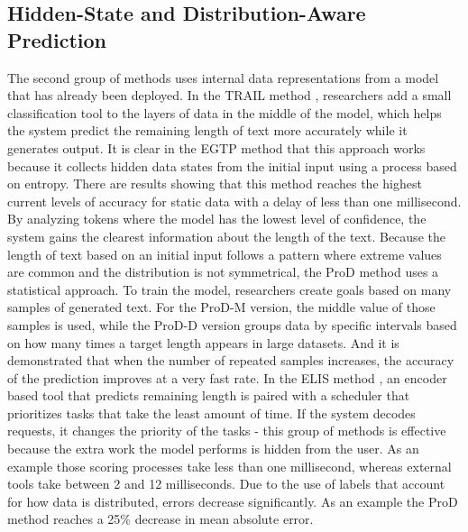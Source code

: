 \documentclass[conference]{IEEEtran}
\begin{document}
\subsection{Hidden-State and Distribution-Aware Prediction}

The second group of methods uses internal data representations from a model that has already been deployed. In the TRAIL method \cite{shahout2025trail}, researchers add a small classification tool to the layers of data in the middle of the model, which helps the system predict the remaining length of text more accurately while it generates output. It is clear in the EGTP method \cite{xie2026egtp} that this approach works because it collects hidden data states from the initial input using a process based on entropy. There are results showing that this method reaches the highest current levels of accuracy for static data with a delay of less than one millisecond. By analyzing tokens where the model has the lowest level of confidence, the system gains the clearest information about the length of the text. Because the length of text based on an initial input follows a pattern where extreme values are common and the distribution is not symmetrical, the ProD method \cite{wang2026prodm} uses a statistical approach. To train the model, researchers create goals based on many samples of generated text. For the ProD-M version, the middle value of those samples is used, while the ProD-D version groups data by specific intervals based on how many times a target length appears in large datasets. And it is demonstrated that when the number of repeated samples increases, the accuracy of the prediction improves at a very fast rate. In the ELIS method \cite{choi2025elis}, an encoder based tool that predicts remaining length is paired with a scheduler that prioritizes tasks that take the least amount of time. If the system decodes requests, it changes the priority of the tasks - this group of methods is effective because the extra work the model performs is hidden from the user. As an example those scoring processes take less than one millisecond, whereas external tools take between 2 and 12 milliseconds. Due to the use of labels that account for how data is distributed, errors decrease significantly. As an example the ProD method reaches a 25\% decrease in mean absolute error.
\end{document}
